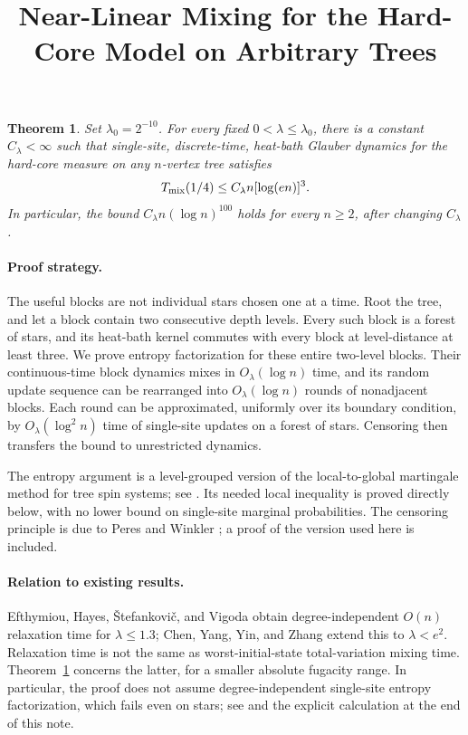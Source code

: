 \documentclass[11pt]{article}
\title{Near-Linear Mixing for the Hard-Core Model on Arbitrary Trees}
\author{}
\date{}
\newtheorem{theorem}{Theorem}
\begin{document}
\maketitle

\begin{theorem}\label{thm:main}
Set $\lambda_0=2^{-10}$. For every fixed $0<\lambda\le\lambda_0$, there is a constant $C_\lambda<\infty$ such that single-site, discrete-time, heat-bath Glauber dynamics for the hard-core measure on any $n$-vertex tree satisfies
\[
T_{\rm mix}(1/4)\le C_\lambda n[\log(en)]^3.
\]
In particular, the bound $C_\lambda n(\log n)^{100}$ holds for every $n\ge2$, after changing $C_\lambda$.
\end{theorem}

\paragraph{Proof strategy.}
The useful blocks are not individual stars chosen one at a time. Root the tree, and let a block contain two consecutive depth levels. Every such block is a forest of stars, and its heat-bath kernel commutes with every block at level-distance at least three. We prove entropy factorization for these entire two-level blocks. Their continuous-time block dynamics mixes in $O_\lambda(\log n)$ time, and its random update sequence can be rearranged into $O_\lambda(\log n)$ rounds of nonadjacent blocks. Each round can be approximated, uniformly over its boundary condition, by $O_\lambda(\log^2 n)$ time of single-site updates on a forest of stars. Censoring then transfers the bound to unrestricted dynamics.

The entropy argument is a level-grouped version of the local-to-global martingale method for tree spin systems; see \cite{MSW,MSW07}. Its needed local inequality is proved directly below, with no lower bound on single-site marginal probabilities. The censoring principle is due to Peres and Winkler \cite{PW}; a proof of the version used here is included.

\paragraph{Relation to existing results.}
Efthymiou, Hayes, \v{S}tefankovi\v{c}, and Vigoda \cite{EHSV} obtain degree-independent $O(n)$ relaxation time for $\lambda\le1.3$; Chen, Yang, Yin, and Zhang \cite{CYYZ} extend this to $\lambda<e^2$. Relaxation time is not the same as worst-initial-state total-variation mixing time. Theorem~\ref{thm:main} concerns the latter, for a smaller absolute fugacity range. In particular, the proof does not assume degree-independent single-site entropy factorization, which fails even on stars; see \cite[Remark~1.4]{EHSV} and the explicit calculation at the end of this note.
\end{document}
